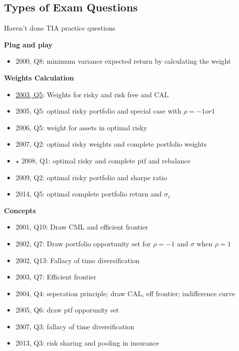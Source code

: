 \documentclass[]{book}
\providecommand{\tightlist}{%
  \setlength{\itemsep}{0pt}\setlength{\parskip}{0pt}}
\theoremstyle{definition}
\theoremstyle{definition}
\theoremstyle{remark}
\begin{document}
\subsection{Types of Exam Questions}\label{types-of-exam-questions-1}

{Haven't done TIA practice questions}

\textbf{Plug and play}

\begin{itemize}
\tightlist
\item
  2000, Q8: minimum variance expected return by calculating the weight
\end{itemize}

\textbf{Weights Calculation}

\begin{itemize}
\tightlist
\item
  \protect\hyperlink{2003-5}{2003, Q5}: Weights for risky and risk free
  and CAL
\item
  2005, Q5: optimal risky portfolio and special case with
  \(\rho = -1 or 1\)
\item
  2006, Q5: weight for assets in optimal risky
\item
  2007, Q2: optimal risky weights and complete portfolio weights
\item
  \(\star\) 2008, Q1: optimal risky and complete ptf and rebalance
\item
  2009, Q2: optimal risky portfolio and sharpe ratio
\item
  2014, Q5: optimal complete portfolio return and \(\sigma_c\)
\end{itemize}

\textbf{Concepts}

\begin{itemize}
\tightlist
\item
  2001, Q10: Draw CML and efficient frontier
\item
  2002, Q7: Draw portfolio opportunity set for \(\rho = -1\) and
  \(\sigma\) when \(\rho = 1\)
\item
  2002, Q13: Fallacy of time diversification
\item
  2003, Q7: Efficient frontier
\item
  2004, Q4: seperation principle; draw CAL, eff frontier; indifference
  curve
\item
  2005, Q6: draw ptf opporunity set
\item
  2007, Q3: fallacy of time diversification
\item
  2013, Q3: risk sharing and pooling in insurance
\end{itemize}
\end{document}
